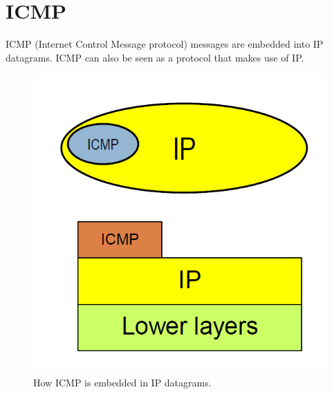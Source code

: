 \chapter{ICMP}
ICMP (Internet Control Message protocol) messages are embedded into IP datagrams\cite{RFC792}. ICMP can also be seen as a protocol that makes use of IP.
\begin{figure}[H]
\centering
\includegraphics[scale=0.35, angle=0]{./Images/ICMP/ICMP_embedding}
\caption{\footnotesize{How ICMP is embedded in IP datagrams.}}
\end{figure}

